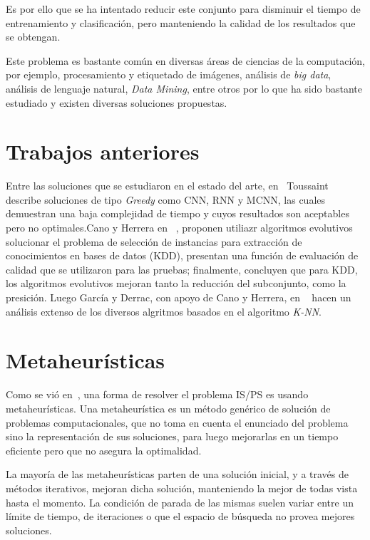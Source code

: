 \documentclass{ci5652}
\begin{document}
Es por ello que se ha intentado reducir este conjunto para disminuir el tiempo de entrenamiento y clasificación, pero manteniendo la calidad de los resultados que se obtengan.

Este problema es bastante común en diversas áreas de ciencias de la computación, por ejemplo, procesamiento y etiquetado de imágenes, análisis de \textit{big data}, análisis de lenguaje natural, \textit{Data Mining}, entre otros por lo que ha sido bastante estudiado y existen diversas soluciones propuestas.

\section{Trabajos anteriores}
\label{sect:works}

Entre las soluciones que se estudiaron en el estado del arte, en~\cite{toussaint2002proximity} Toussaint describe soluciones de tipo \textit{Greedy} como CNN, RNN y MCNN, las cuales demuestran una baja complejidad de tiempo y cuyos resultados son aceptables pero no optimales.Cano y Herrera en ~\cite{1255391}, proponen utiliazr algoritmos evolutivos solucionar el problema de selección de instancias para extracción de conocimientos en bases de datos (KDD), presentan una función de evaluación de calidad que se utilizaron para las pruebas; finalmente, concluyen que para KDD, los algoritmos evolutivos mejoran tanto la reducción del subconjunto, como la presición. Luego García y Derrac, con apoyo de Cano y Herrera, en ~\cite{garcia2012prototype} hacen un análisis extenso de los diversos algritmos basados en el algoritmo \textit{K-NN}.

\section{Metaheurísticas}
\label{sect:meta}

Como se vió en~\cite{1255391}, una forma de resolver el problema IS/PS es usando metaheurísticas. Una metaheurística es un método genérico de solución de problemas computacionales, que no toma en cuenta el enunciado del problema sino la representación de sus soluciones, para luego mejorarlas en un tiempo eficiente pero que no asegura la optimalidad.

La mayoría de las metaheurísticas parten de una solución inicial, y a través de métodos iterativos, mejoran dicha solución, manteniendo la mejor de todas vista hasta el momento. La condición de parada de las mismas suelen variar entre un límite de tiempo, de iteraciones o que el espacio de búsqueda no provea mejores soluciones.
\end{document}
